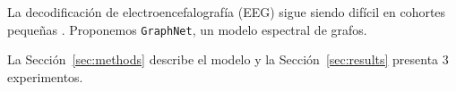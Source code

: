 La decodificación de electroencefalografía (EEG) sigue siendo difícil en cohortes pequeñas \citep{smith2020}. Proponemos \texttt{GraphNet}, un modelo espectral de grafos.

La Sección~\ref{sec:methods} describe el modelo y la Sección~\ref{sec:results} presenta 3 experimentos.
